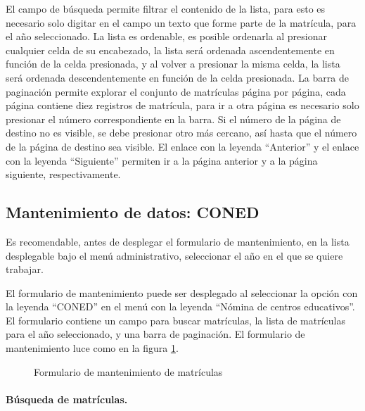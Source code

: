 \documentclass[a4paper, 9pt, conference]{article}              %
\begin{document}
El campo de b\'usqueda permite filtrar el contenido de la lista, para esto es necesario solo digitar en el campo un texto que forme parte de la matr\'icula, para el a\~no seleccionado. La lista es ordenable, es posible ordenarla al presionar cualquier celda de su encabezado, la lista ser\'a ordenada ascendentemente en funci\'on de la celda presionada, y al volver a presionar la misma celda, la lista ser\'a ordenada descendentemente en funci\'on de la celda presionada. La barra de paginaci\'on permite explorar el conjunto de matr\'iculas p\'agina por p\'agina, cada p\'agina contiene diez registros de matr\'icula, para ir a otra p\'agina es necesario solo presionar el n\'umero correspondiente en la barra. Si el n\'umero de la p\'agina de destino no es visible, se debe presionar otro m\'as cercano, as\'i hasta que el n\'umero de la p\'agina de destino sea visible. El enlace con la leyenda ``Anterior'' y el enlace con la leyenda ``Siguiente'' permiten ir a la p\'agina anterior y a la p\'agina siguiente, respectivamente.


\subsection{Mantenimiento de datos: CONED}
Es recomendable, antes de desplegar el formulario de mantenimiento, en la lista desplegable bajo el men\'u administrativo, seleccionar el a\~no en el que se quiere trabajar.

El formulario de mantenimiento puede ser desplegado al seleccionar la opci\'on con la leyenda ``CONED'' en el men\'u con la leyenda ``N\'omina de centros educativos''. El formulario contiene un campo para buscar matr\'iculas, la lista de matr\'iculas para el a\~no seleccionado, y una barra de paginaci\'on. El formulario de mantenimiento luce como en la figura \ref{fig:geoenrollments10}.

\begin{figure}
	\centering
		\caption{Formulario de mantenimiento de matr\'iculas}
	\label{fig:geoenrollments10}
\end{figure}


\paragraph{B\'usqueda de matr\'iculas.}
\end{document}
